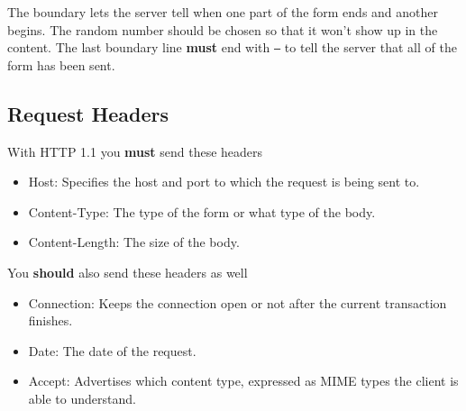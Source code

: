 \documentclass[../CMPUT-404-Notes.tex]{subfiles}
\begin{document}
The boundary lets the server tell when one part of the form ends and another begins. 
The random number should be chosen so that it won't show up in the content.
The last boundary line \textbf{must} end with \texttt{--} to tell the server that all of the form has been sent.

\subsection{Request Headers}
With HTTP 1.1 you \textbf{must} send these headers
\begin{itemize}
  \item Host: Specifies the host and port to which the request is being sent to.
  \item Content-Type: The type of the form or what type of the body.
  \item Content-Length: The size of the body.
\end{itemize}

You \textbf{should} also send these headers as well
\begin{itemize}
  \item Connection: Keeps the connection open or not after the current transaction finishes.
  \item Date: The date of the request.
  \item Accept: Advertises which content type, expressed as MIME types the client is able to understand.
\end{itemize}
\end{document}
